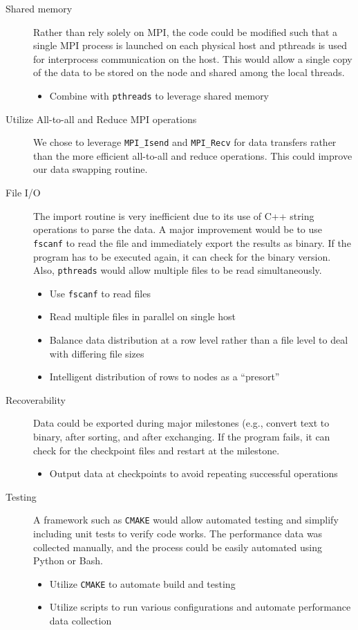 \documentclass{article}
\begin{document}
\begin{description}
    \item [Shared memory]{Rather than rely solely on MPI, the code could be modified such that a single MPI process is launched on each physical host and pthreads is used for interprocess communication on the host. This would allow a single copy of the data to be stored on the node and shared among the local threads.}
        \begin{itemize}
            \item Combine with \texttt{pthreads} to leverage shared memory
        \end{itemize}
    \item [Utilize All-to-all and Reduce MPI operations]{We chose to leverage \texttt{MPI_Isend} and \texttt{MPI_Recv} for data transfers rather than the more efficient all-to-all and reduce operations. This could improve our data swapping routine.}
    \item [File I/O]{The import routine is very inefficient due to its use of C++ string operations to parse the data. A major improvement would be to use \texttt{fscanf} to read the file and immediately export the results as binary. If the program has to be executed again, it can check for the binary version. Also, \texttt{pthreads} would allow multiple files to be read simultaneously.}
        \begin{itemize}
            \item Use \texttt{fscanf} to read files
            \item Read multiple files in parallel on single host
            \item Balance data distribution at a row level rather than a file level to deal with differing file sizes
            \item Intelligent distribution of rows to nodes as a ``presort''
        \end{itemize}
    \item [Recoverability]{Data could be exported during major milestones (e.g., convert text to binary, after sorting, and after exchanging. If the program fails, it can check for the checkpoint files and restart at the milestone.}
        \begin{itemize}
            \item Output data at checkpoints to avoid repeating successful operations
        \end{itemize}
     \item [Testing]{A framework such as \texttt{CMAKE} would allow automated testing and simplify including unit tests to verify code works. The performance data was collected manually, and the process could be easily automated using Python or Bash.}
     	\begin{itemize}
	\item Utilize \texttt{CMAKE} to automate build and testing
	\item Utilize scripts to run various configurations and automate performance data collection
	\end{itemize}
\end{description}


\end{document}
